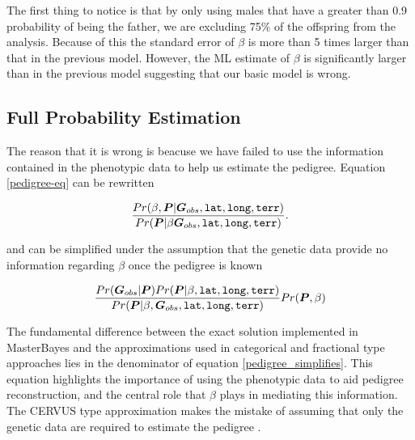 \documentclass{article}
\begin{document}
The first thing to notice is that by only using males that have a greater than 0.9 probability of being the father, we are excluding 75\% of the offspring from the analysis. Because of this the standard error of $\beta$ is more than 5 times larger than that in the previous model.  However, the ML estimate of $\beta$ is significantly larger than in the previous model suggesting that our basic model is wrong. 


\subsection{Full Probability Estimation}
\label{fp-sec}

 The reason that it is wrong is beacuse we have failed to use the information contained in the phenotypic data to help us estimate the pedigree.  Equation \ref{pedigree-eq} can be rewritten

\begin{equation}
\frac{Pr(\beta,  {\bm P}| {\bm G}_{obs}, \textrm{\texttt{lat}}, \textrm{\texttt{long}}, \textrm{\texttt{terr}})}{Pr({\bm P}| \beta {\bm G}_{obs}, \textrm{\texttt{lat}}, \textrm{\texttt{long}}, \textrm{\texttt{terr}})}.
\label{pedigree_expanded}
\end{equation}

and can be simplified  under the assumption that the genetic data provide no information regarding $\beta$ once the pedigree is known

\begin{equation}
\frac{Pr({\bm G}_{obs} | {\bm P})Pr({\bm P} | \beta,\textrm{\texttt{lat}}, \textrm{\texttt{long}}, \textrm{\texttt{terr}})}{Pr({\bm P}| \beta, {\bm G}_{obs}, \textrm{\texttt{lat}}, \textrm{\texttt{long}}, \textrm{\texttt{terr}})}Pr({\bm P}, \beta)
\label{pedigree_simplifies}
\end{equation}

The fundamental difference between the exact solution implemented in MasterBayes and the approximations used in categorical and fractional type approaches lies in the denominator of equation \ref{pedigree_simplifies}.  This equation highlights the importance of using the phenotypic data to aid pedigree reconstruction, and the central role that $\beta$ plays in mediating this information.  The CERVUS type approximation makes the mistake of assuming that only the genetic data are required to estimate the pedigree \citep[see the information boxes in][]{Hadfield.2006c}.\\
\end{document}
